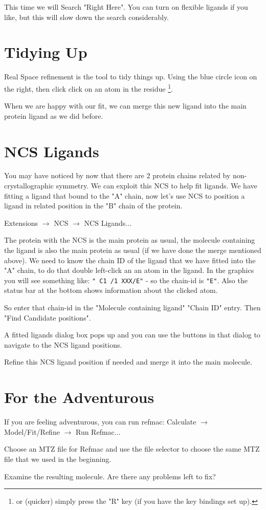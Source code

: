 \documentclass{article}
\begin{document}
 This time we will Search "Right Here".  You can turn on flexible
 ligands if you like, but this will slow down the search
 considerably. 

\section{Tidying Up}

Real Space refinement is the tool to tidy things up. Using the blue
circle icon on the right, then click click on an atom in the residue
\footnote{or (quicker) simply press the "R" key (if you have the key
  bindings set up).}.

 When we are happy with our fit, we can merge this new ligand into the
 main protein ligand as we did before.

\section{NCS Ligands}

 You may have noticed by now that there are 2 protein chains related
 by non-crystallographic symmetry.  We can exploit this NCS to help
 fit ligands.  We have fitting a ligand that bound to the "A" chain,
 now let's use NCS to position a ligand in related position in the "B"
 chain of the protein.

 \textsf{Extensions $\rightarrow$ NCS $\rightarrow$ NCS Ligands...}

 The protein with the NCS is the main protein as usual, the molecule
 containing the ligand is also the main protein as usual (if we have
 done the merge mentioned above).  We need to know the chain ID of the
 ligand that we have fitted into the "A" chain, to do that double
 left-click an an atom in the ligand. In the graphics you will see
 something like: \texttt{" C1 /1 XXX/E"} - so the chain-id is
 \texttt{"E"}. Also the status bar at the bottom shows information about
 the clicked atom.

 So enter that chain-id in the "Molecule containing ligand" "Chain ID"
 entry.  Then \textsf{"Find Candidate positions"}.
 
 A fitted ligands dialog box pops up and you can use the buttons in
 that dialog to navigate to the NCS ligand positions.

 Refine this NCS ligand position if needed and merge it into the main
 molecule.

\section{For the Adventurous}

If you are feeling adventurous, you can run refmac: \textsf{Calculate
  $\rightarrow$ Model/Fit/Refine $\rightarrow$ Run Refmac...}

 Choose an MTZ file for Refmac and use the file selector to choose the
 same MTZ file that we used in the beginning.

 Examine the resulting molecule.  Are there any problems left to fix?
\end{document}
